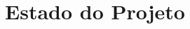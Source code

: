 \documentclass[12pt,a4paper]{article}
\begin{document}


\section*{Estado do Projeto}
\label{sec:state}

\end{document}
